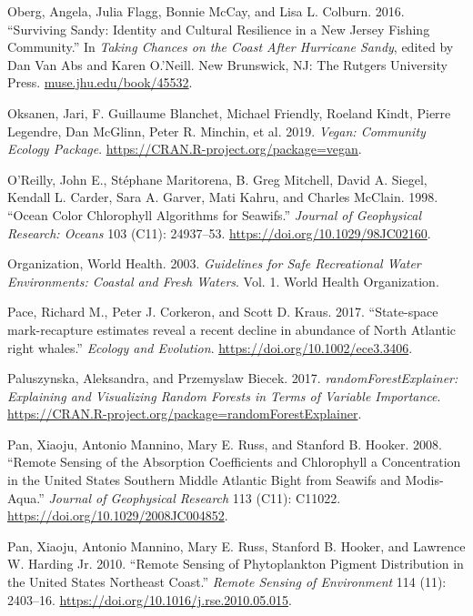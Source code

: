 \documentclass[
]{book}
\newlength{\cslhangindent}
\newenvironment{cslreferences}%
  {\setlength{\parindent}{0pt}%
  \everypar{\setlength{\hangindent}{\cslhangindent}}\ignorespaces}%
  {\par}
\begin{document}
\begin{cslreferences}
\leavevmode\hypertarget{ref-oberg_surviving_2016}{}%
Oberg, Angela, Julia Flagg, Bonnie McCay, and Lisa L. Colburn. 2016. ``Surviving Sandy: Identity and Cultural Resilience in a New Jersey Fishing Community.'' In \emph{Taking Chances on the Coast After Hurricane Sandy}, edited by Dan Van Abs and Karen O.'Neill. New Brunswick, NJ: The Rutgers University Press. \url{muse.jhu.edu/book/45532}.

\leavevmode\hypertarget{ref-R-vegan}{}%
Oksanen, Jari, F. Guillaume Blanchet, Michael Friendly, Roeland Kindt, Pierre Legendre, Dan McGlinn, Peter R. Minchin, et al. 2019. \emph{Vegan: Community Ecology Package}. \url{https://CRAN.R-project.org/package=vegan}.

\leavevmode\hypertarget{ref-SOE11}{}%
O'Reilly, John E., Stéphane Maritorena, B. Greg Mitchell, David A. Siegel, Kendall L. Carder, Sara A. Garver, Mati Kahru, and Charles McClain. 1998. ``Ocean Color Chlorophyll Algorithms for Seawifs.'' \emph{Journal of Geophysical Research: Oceans} 103 (C11): 24937--53. \url{https://doi.org/10.1029/98JC02160}.

\leavevmode\hypertarget{ref-WHO2003}{}%
Organization, World Health. 2003. \emph{Guidelines for Safe Recreational Water Environments: Coastal and Fresh Waters}. Vol. 1. World Health Organization.

\leavevmode\hypertarget{ref-Pace2017}{}%
Pace, Richard M., Peter J. Corkeron, and Scott D. Kraus. 2017. ``State-space mark-recapture estimates reveal a recent decline in abundance of North Atlantic right whales.'' \emph{Ecology and Evolution}. \url{https://doi.org/10.1002/ece3.3406}.

\leavevmode\hypertarget{ref-randomForestExplainer}{}%
Paluszynska, Aleksandra, and Przemyslaw Biecek. 2017. \emph{randomForestExplainer: Explaining and Visualizing Random Forests in Terms of Variable Importance}. \url{https://CRAN.R-project.org/package=randomForestExplainer}.

\leavevmode\hypertarget{ref-SOE12}{}%
Pan, Xiaoju, Antonio Mannino, Mary E. Russ, and Stanford B. Hooker. 2008. ``Remote Sensing of the Absorption Coefficients and Chlorophyll a Concentration in the United States Southern Middle Atlantic Bight from Seawifs and Modis-Aqua.'' \emph{Journal of Geophysical Research} 113 (C11): C11022. \url{https://doi.org/10.1029/2008JC004852}.

\leavevmode\hypertarget{ref-SOE13}{}%
Pan, Xiaoju, Antonio Mannino, Mary E. Russ, Stanford B. Hooker, and Lawrence W. Harding Jr. 2010. ``Remote Sensing of Phytoplankton Pigment Distribution in the United States Northeast Coast.'' \emph{Remote Sensing of Environment} 114 (11): 2403--16. \url{https://doi.org/10.1016/j.rse.2010.05.015}.


\end{cslreferences}
\end{document}
